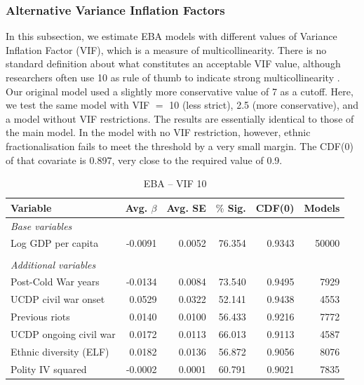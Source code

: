 \documentclass[a4paper,12pt]{article}
\begin{document}
\subsubsection{Alternative Variance Inflation Factors}

In this subsection, we estimate EBA models with different values of Variance Inflation Factor (VIF), which is a measure of multicollinearity. There is no standard definition about what constitutes an acceptable VIF value, although researchers often use 10 as rule of thumb to indicate strong multicollinearity \citep[674]{o2007caution}. Our original model used a slightly more conservative value of 7 as a cutoff. Here, we test the same model with VIF $=$ 10 (less strict), 2.5 (more conservative), and a model without VIF restrictions. The results are essentially identical to those of the main model. In the model with no VIF restriction, however, ethnic fractionalisation fails to meet the threshold by a very small margin. The CDF(0) of that covariate is 0.897, very close to the required value of 0.9. 

\vspace{1cm}

\begin{table}[H]
\centering
\begin{tabular}{lrrrrr}
\hline
\textbf{Variable} & \textbf{Avg. $\beta$} & \textbf{Avg. SE} & \textbf{$\%$ Sig.} & \textbf{CDF(0)} & \textbf{Models} \\ \hline
\textit{Base variables} &  &  &  &  &  \\
Log GDP per capita & -0.0091 & 0.0052 & 76.354 & 0.9343 & 50000 \\
 &  &  &  &  &  \\
\textit{Additional variables} &  &  &  &  &  \\
Post-Cold War years & -0.0134 & 0.0084 & 73.540 & 0.9495 & 7929 \\
UCDP civil war onset & 0.0529 & 0.0322 & 52.141 & 0.9438 & 4553 \\
Previous riots & 0.0140 & 0.0100 & 56.433 & 0.9216 & 7772 \\
UCDP ongoing civil war & 0.0172 & 0.0113 & 66.013 & 0.9113 & 4587 \\
Ethnic diversity (ELF) & 0.0182 & 0.0136 & 56.872 & 0.9056 & 8076 \\
Polity IV squared & -0.0002 & 0.0001 & 60.791 & 0.9021 & 7835 \\ \hline
\end{tabular}
\caption{EBA -- VIF 10}
\label{tab:mk-high-vif}
\end{table}
\end{document}
